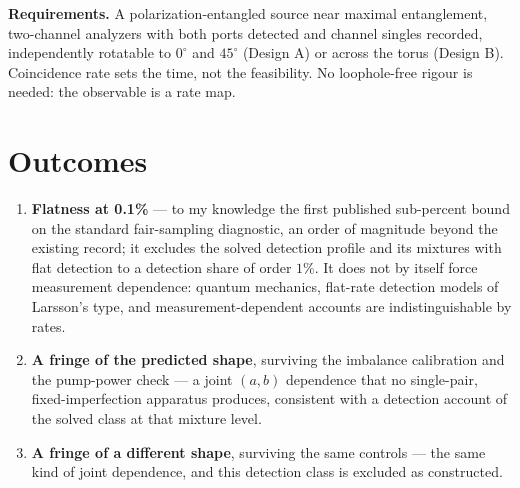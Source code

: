 \documentclass[10pt]{article}
\begin{document}
\textbf{Requirements.} A polarization-entangled source near maximal entanglement, two-channel analyzers with both ports detected and channel singles recorded, independently rotatable to $0^\circ$ and $45^\circ$ (Design A) or across the torus (Design B). Coincidence rate sets the time, not the feasibility. No loophole-free rigour is needed: the observable is a rate map.

\section*{Outcomes}
\begin{enumerate}[nosep]
\item \textbf{Flatness at 0.1\%} --- to my knowledge the first published sub-percent bound on the standard fair-sampling diagnostic, an order of magnitude beyond the existing record; it excludes the solved detection profile and its mixtures with flat detection to a detection share of order $1\%$. It does not by itself force measurement dependence: quantum mechanics, flat-rate detection models of Larsson's type, and measurement-dependent accounts are indistinguishable by rates.
\item \textbf{A fringe of the predicted shape}, surviving the imbalance calibration and the pump-power check --- a joint $(a,b)$ dependence that no single-pair, fixed-imperfection apparatus produces, consistent with a detection account of the solved class at that mixture level.
\item \textbf{A fringe of a different shape}, surviving the same controls --- the same kind of joint dependence, and this detection class is excluded as constructed.
\end{enumerate}
\end{document}
